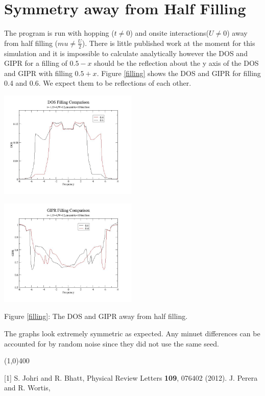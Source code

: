 \documentclass{article}
\begin{document}
\section{Symmetry away from Half Filling}
The program is run with hopping ($t\ne0$) and onsite interactions($U\ne0$) away from half filling ($mu\ne\frac{U}{2}$). There is little published work at the moment for this simulation and it is impossible to calculate analytically however the DOS and GIPR for a filling of $0.5-x$ should be the reflection about the y axis of the DOS and GIPR with filling $0.5+x$. Figure \ref{filling} shows the DOS and GIPR for filling 0.4 and 0.6. We expect them to be reflections of each other.
\begin{multicols}{2}
\begin{center}
	\includegraphics[width=250px]{dos_comparef.jpg} \\ \label{filling}
\end{center}
\begin{center}
	\includegraphics[width=250px]{gipr_comparef.jpg} \\
\end{center}
\end{multicols}
\begin{center}
Figure \ref{filling}: The DOS and GIPR away from half filling. 
\end{center}
The graphs look extremely symmetric as expected. Any minuet differences can be accounted for by random noise since they did not use the same seed. 
\begin{center}
	\line(1,0){400}
\end{center}
[1] S. Johri and R. Bhatt, Physical Review Letters \textbf{109}, 076402 (2012). \newline
[2] J. Perera and R. Wortis,
\end{document}

